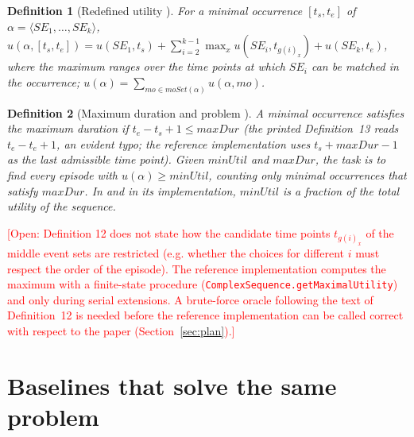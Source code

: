 \documentclass[11pt]{article}
\newtheorem{definition}{Definition}
\newcommand{\open}[1]{\textcolor{red}{[Open: #1]}}
\begin{document}
\begin{definition}[Redefined utility {\cite[Def.~12]{fournier2019huespan}}]
For a minimal occurrence $[t_s, t_e]$ of $\alpha = \langle SE_1, \dots, SE_k\rangle$,
$u(\alpha, [t_s, t_e]) = u(SE_1, t_s) + \sum_{i=2}^{k-1} \max_x u(SE_i, t_{g(i)_x}) + u(SE_k, t_e)$,
where the maximum ranges over the time points at which $SE_i$ can be matched in the occurrence; $u(\alpha) = \sum_{mo \in \mathit{moSet}(\alpha)} u(\alpha, mo)$.
\end{definition}

\begin{definition}[Maximum duration and problem {\cite[Defs.~13--14]{fournier2019huespan}}]
A minimal occurrence satisfies the maximum duration if $t_e - t_s + 1 \le \mathit{maxDur}$ (the printed Definition~13 reads $t_e - t_e + 1$, an evident typo; the reference implementation uses $t_s + \mathit{maxDur} - 1$ as the last admissible time point). Given $\mathit{minUtil}$ and $\mathit{maxDur}$, the task is to find every episode with $u(\alpha) \ge \mathit{minUtil}$, counting only minimal occurrences that satisfy $\mathit{maxDur}$. In \cite{fournier2019huespan} and in its implementation, $\mathit{minUtil}$ is a fraction of the total utility of the sequence.
\end{definition}

\noindent\open{Definition 12 does not state how the candidate time points $t_{g(i)_x}$ of the middle event sets are restricted (e.g. whether the choices for different $i$ must respect the order of the episode). The reference implementation computes the maximum with a finite-state procedure (\texttt{ComplexSequence.getMaximalUtility}) and only during serial extensions. A brute-force oracle following the text of Definition~12 is needed before the reference implementation can be called correct with respect to the paper (Section~\ref{sec:plan}).}

\section{Baselines that solve the same problem}\label{sec:baselines}
\end{document}
